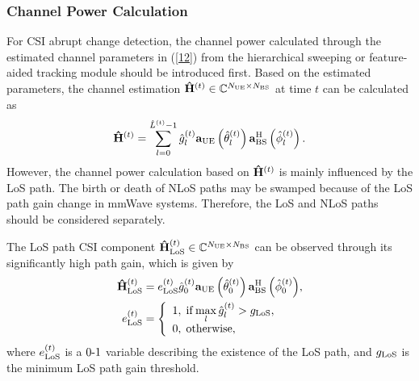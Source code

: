 \documentclass[journal,12pt,onecolumn,draftclsnofoot,]{IEEEtran}
\begin{document}
\subsubsection{Channel Power Calculation} 
For CSI abrupt change detection, the channel power calculated through the estimated channel parameters in (\ref{12}) from the hierarchical sweeping or feature-aided tracking module should be introduced first.
Based on the estimated parameters, the channel estimation ${{\bf{\hat H}}}^{\left(t \right)} \in {\mathbb{C}^{{N_{\rm UE}} \times {{N_{\rm BS}}}}} $ at time $t$ can be calculated as
\begin{equation}
\label{24}
{{{{\bf{\hat H}}}^{\left(t \right)}}}=\mathop \sum \limits_{l = 0}^{{{\hat L}^{\left({t} \right)}}-1} \hat g_l^{\left(t \right)}{{\bf{a}}_{{\rm{UE}}}}\left({\hat \theta _l^{\left(t \right)}} \right){\bf{a}}_{{\rm{BS}}}^{\rm H}\left({\hat \phi _l^{\left(t \right)}} \right).
\end{equation}
However, the channel power calculation based on ${{\bf{\hat H}}}^{(t )}$ is mainly influenced by the LoS path. 
The birth or death of NLoS paths may be swamped because of the LoS path gain change in mmWave systems. Therefore, the LoS and NLoS paths should be considered separately.

The LoS path CSI component ${\bf{\hat H}}_{{\rm{LoS}}}^{(t )} \in {\mathbb{C}^{{N_{\rm UE}} \times {{N_{\rm BS}}}}}$ can 
be observed through its significantly high path gain, which is given by
\begin{subequations}
\label{25}
\begin{align}
\label{25a}
{\bf{\hat H}}_{{\rm{LoS}}}^{\left(t \right)} &={e_{\rm LoS}^{\left(t \right)}}{ \hat g_0^{\left(t \right)}{{\bf{a}}_{{\rm{UE}}}}\left({\hat \theta _0^{\left(t \right)}} \right){\bf{a}}_{{\rm{BS}}}^{\rm{H}}\left({\hat \phi _0^{\left(t \right)}} \right)},
\\
\label{25b}
e_{{\rm{LoS}}}^{\left(t \right)} &= \left\{ {\begin{array}{*{20}{l}}
{1,\;{\rm{if}}\mathop {\max }\limits_l \hat g_l^{\left(t \right)} > {g_{\rm LoS}}},\\
{0,\;{\rm{otherwise}}},
\end{array}} \right.
\end{align}
\end{subequations}
\noindent where $e_{{\rm{LoS}}}^{(t )}$ is a $0{\raisebox{0mm}{-}}1$ variable describing the existence of the LoS path, and ${g_{\rm LoS}}$ is the minimum LoS path gain threshold. 
\end{document}
